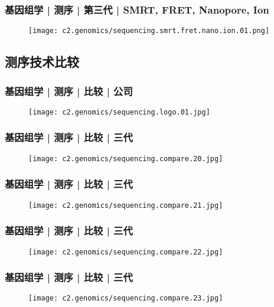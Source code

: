\begin{frame}
  \frametitle{基因组学 | 测序 | 第三代 | SMRT, FRET, Nanopore, Ion}
  \begin{figure}
    \centering
    \texttt{[image: c2.genomics/sequencing.smrt.fret.nano.ion.01.png]}
  \end{figure}
\end{frame}

\subsection{测序技术比较}
\begin{frame}
  \frametitle{基因组学 | 测序 | 比较 | 公司}
  \begin{figure}
    \centering
    \texttt{[image: c2.genomics/sequencing.logo.01.jpg]}
  \end{figure}
\end{frame}

\begin{frame}
  \frametitle{基因组学 | 测序 | 比较 | 三代}
  \begin{figure}
    \centering
    \texttt{[image: c2.genomics/sequencing.compare.20.jpg]}
  \end{figure}
\end{frame}

\begin{frame}
  \frametitle{基因组学 | 测序 | 比较 | 三代}
  \begin{figure}
    \centering
    \texttt{[image: c2.genomics/sequencing.compare.21.jpg]}
  \end{figure}
\end{frame}

\begin{frame}
  \frametitle{基因组学 | 测序 | 比较 | 三代}
  \begin{figure}
    \centering
    \texttt{[image: c2.genomics/sequencing.compare.22.jpg]}
  \end{figure}
\end{frame}

\begin{frame}
  \frametitle{基因组学 | 测序 | 比较 | 三代}
  \begin{figure}
    \centering
    \texttt{[image: c2.genomics/sequencing.compare.23.jpg]}
  \end{figure}
\end{frame}

